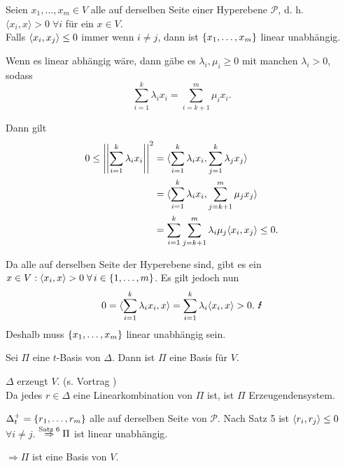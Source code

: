 \documentclass[12pt]{extarticle}
\begin{document}
\begin{satz} %
    Seien \( x_1, \ldots, x_m \in V \) alle auf derselben 
    Seite einer Hyperebene \( \mathscr{P} \), 
    d. h. \( \langle x_i, x \rangle > 0 \;\forall i \) für 
    ein \( x\in V \). \\
    Falls \( \langle x_i, x_j \rangle \leq 0 \) immer wenn 
    \( i \neq j \), dann ist \( \{x_1, \ldots, x_m\} \) 
    linear unabhängig.
\end{satz}

\begin{bew}
    Wenn es linear abhängig wäre, dann gäbe es 
    \( \lambda_i, \mu_i \geq 0 \) mit 
    manchen \( \lambda_i > 0 \), sodass 
    \[ \sum_{i=1}^k \lambda_i x_i 
    = \sum_{i=k+1}^m \mu_i x_i. \]

    Dann gilt 
    \begin{align*}
        0 \leq \norm{\sum_{i=1}^k \lambda_i x_i}^2 
        &= \scalarprod{\sum_{i=1}^{k} \lambda_{i} x_{i}}{
        \sum_{j=1}^{k} \lambda_{j} x_{j}} \\
        &= \scalarprod{\sum_{i=1}^{k} \lambda_{i} x_{i}}{
        \sum_{j=k+1}^{m} \mu_{j} x_{j}} \\
        &= \sum_{i=1}^{k} \sum_{j=k+1}^{m} \lambda_{i} \mu_{j}
        \scalarprod{x_i}{x_j} 
        \leq 0. %
    \end{align*}

    Da alle auf derselben Seite der Hyperebene sind, 
    gibt es ein \( x \in V: \scalarprod{x_i}{x} > 0 
    \;\forall i \in \set{1,\ldots, m} \).
    Es gilt jedoch nun 
    \[ 0 = \scalarprod{\sum_{i=1}^{k} \lambda_i x_i}{x} 
    = \sum_{i=1}^k \lambda_i \scalarprod{x_i}{x} > 0. \text{ \Lightning{}} \]
    Deshalb muss \( \{x_1, \ldots, x_m\} \) linear 
    unabhängig sein.
\end{bew}

\begin{satz} %
    Sei \( \Pi \) eine \(t\)-Basis von \( \Delta \). Dann ist 
    \( \Pi \) eine Basis für \( V \).
\end{satz}
\begin{bew}
    \( \Delta \) erzeugt \( V \). (s. Vortrag )\\
    Da jedes \( r \in \Delta \) eine Linearkombination von \( \Pi \) ist, 
    ist \( \Pi \) Erzeugendensystem.

    \( \Delta_t^+ = \{r_1, \ldots, r_m\} \) alle auf derselben Seite 
    von \( \mathscr{P} \). Nach Satz 5 ist \( \langle r_i, r_j \rangle \leq 0 \)
    \( \forall i \neq j \). \( \overset{\text{Satz 6}}{\Rightarrow} \Pi \) 
    ist linear unabhängig.

    \( \Rightarrow \Pi \) ist eine Basis von \(V\).
\end{bew}
\end{document}
